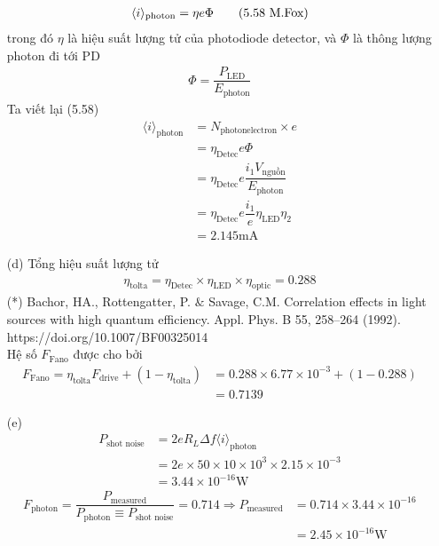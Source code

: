 \documentclass{report}
\newcommand{\f}[2]{\dfrac{#1}{#2}}
\begin{document}
\begin{enumerate}
	\begin{align*}
		\langle i \rangle_{\text{photon}} = \eta e \Phi \tag{5.58 \text{M.Fox}}
	\end{align*}
	trong đó $\eta$ là hiệu suất lượng tử của photodiode detector, và $\Phi$ là thông lượng photon đi tới PD\\
	\begin{align*}
		\Phi = \f{P_{\text{LED}}}{E_{\text{photon}}}
	\end{align*}
	Ta viết lại (5.58)
	\begin{align*}
		\langle i \rangle_{\text{photon}}
		& = N_{\text{photonelectron}} \times e                                  \\
		& = \eta_{\text{Detec}} e \Phi                                          \\
		& = \eta_{\text{Detec}} e \f{i_{1} V_{\text{nguồn}}}{E_{\text{photon}}} \\
		& = \eta_{\text{Detec}} e \f{i_{1}}{e} \eta_{\text{LED}} \eta_{2}       \\
		& = 2.145 \text{mA}
	\end{align*}
	\item[(d)] Tổng hiệu suất lượng tử
	\begin{align*}
		\eta_{\text{tolta}} = \eta_{\text{Detec}} \times \eta_{\text{LED}} \times \eta_{\text{optic}} = 0.288  \tag{*}
	\end{align*}
	(*) Bachor, HA., Rottengatter, P. $\&$ Savage, C.M. Correlation effects in light sources with high quantum efficiency. Appl. Phys. B 55, 258–264 (1992).\\ https://doi.org/10.1007/BF00325014 \\
	Hệ số $F_{\text{Fano}}$ được cho bởi
	\begin{align*}
		F_{\text{Fano}} = \eta_{\text{tolta}} F_{\text{drive}} + (1 - \eta_{\text{tolta}})
		& = 0.288 \times 6.77 \times 10^{-3} + (1 - 0.288) \\
		& = 0.7139
	\end{align*}
	\item[(e)]
	\begin{align*}
		P_{\text{shot noise}}
		& = 2 e R_{L} \Delta f \langle i \rangle_{\text{photon}}            \\
		& = 2e \times 50 \times 10 \times 10^{3} \times 2.15 \times 10^{-3} \\
		& = 3.44 \times 10^{-16} \text{W} \tag{1}
	\end{align*}
	\begin{align*}
		F_{\text{photon}} = \f{P_\text{measured}}{P_{\text{photon}} \equiv P_{\text{shot noise}} } = 0.714 \Rightarrow P_\text{measured}
		& = 0.714 \times 3.44 \times 10^{-16} \\
		& = 2.45 \times 10^{-16} \text{W}
	\end{align*}
\end{enumerate}
\end{document}
